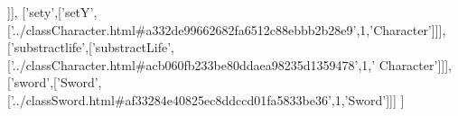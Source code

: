 \begin{DoxyCode}
  [\textcolor{stringliteral}{'setx'},[\textcolor{stringliteral}{'setX'},[\textcolor{stringliteral}{'../classCharacter.html#ab666a436a79cfa39a9d30e0025e1287a'},1,\textcolor{stringliteral}{'Character'}]]],
  [\textcolor{stringliteral}{'sety'},[\textcolor{stringliteral}{'setY'},[\textcolor{stringliteral}{'../classCharacter.html#a332de99662682fa6512c88ebbb2b28e9'},1,\textcolor{stringliteral}{'Character'}]]],
  [\textcolor{stringliteral}{'substractlife'},[\textcolor{stringliteral}{'substractLife'},[\textcolor{stringliteral}{'../classCharacter.html#acb060fb233be80ddaea98235d1359478'},1,\textcolor{stringliteral}{'
      Character'}]]],
  [\textcolor{stringliteral}{'sword'},[\textcolor{stringliteral}{'Sword'},[\textcolor{stringliteral}{'../classSword.html#af33284e40825ec8ddccd01fa5833be36'},1,\textcolor{stringliteral}{'Sword'}]]]
]
\end{DoxyCode}
